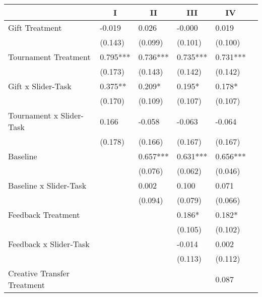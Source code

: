 \documentclass{article}
\begin{document}
\begin{table}[H]%
\begin{center}%
{\small\renewcommand{\arraystretch}{0.9}%
\begin{tabular}{llllll}
\hline\hline\noalign{\smallskip}
                    &\multicolumn{1}{c}{I}&\multicolumn{1}{c}{II}&\multicolumn{1}{c}{III}&\multicolumn{1}{c}{IV}\\
\hline\noalign{\smallskip}
Gift Treatment      &      -0.019   &       0.026   &      -0.000   &       0.019   \\
                    &     (0.143)   &     (0.099)   &     (0.101)   &     (0.100)   \\[4mm]
Tournament Treatment&       0.795***&       0.736***&       0.735***&       0.731***\\
                    &     (0.173)   &     (0.143)   &     (0.142)   &     (0.142)   \\[4mm]
Gift x Slider-Task  &       0.375** &       0.209*  &       0.195*  &       0.178*  \\
                    &     (0.170)   &     (0.109)   &     (0.107)   &     (0.107)   \\[4mm]
Tournament x Slider-Task&       0.166   &      -0.058   &      -0.063   &      -0.064   \\
                    &     (0.178)   &     (0.166)   &     (0.167)   &     (0.167)   \\[4mm]
Baseline            &               &       0.657***&       0.631***&       0.656***\\
                    &               &     (0.076)   &     (0.062)   &     (0.046)   \\[4mm]
Baseline x Slider-Task&               &       0.002   &       0.100   &       0.071   \\
                    &               &     (0.094)   &     (0.079)   &     (0.066)   \\[4mm]
Feedback Treatment  &               &               &       0.186*  &       0.182*  \\
                    &               &               &     (0.105)   &     (0.102)   \\[4mm]
Feedback x Slider-Task&               &               &      -0.014   &       0.002   \\
                    &               &               &     (0.113)   &     (0.112)   \\[4mm]
Creative Transfer Treatment&               &               &               &       0.087   \\

\end{tabular}}
\end{center}
\end{table}
\end{document}
